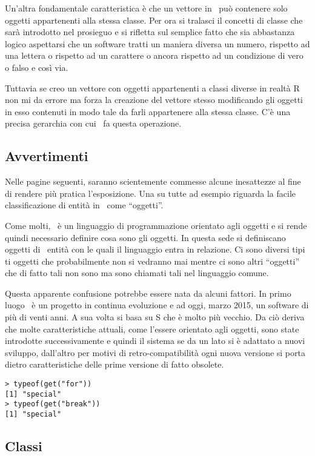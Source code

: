 Un'altra fondamentale caratteristica è che un vettore in \erre\ può contenere solo oggetti appartenenti alla stessa classe. Per ora si tralasci il concetti di classe che sarà introdotto nel prosieguo e si rifletta sul semplice fatto che sia abbastanza logico aspettarsi che un software tratti un maniera diversa un numero, rispetto ad una lettera o rispetto ad un carattere o ancora rispetto ad un condizione di vero o falso e così via.

Tuttavia se creo un vettore con oggetti appartenenti a classi diverse in realtà R non mi da errore ma forza la creazione del vettore stesso modificando gli oggetti in esso contenuti in modo tale da farli appartenere alla stessa classe. C’è una precisa gerarchia con cui \erre\ fa questa operazione.

\subsection{Avvertimenti}
Nelle pagine seguenti, saranno scientemente commesse alcune inesattezze al fine di rendere più pratica l'esposizione. Una su tutte ad esempio riguarda la facile classificazione di entità in \erre\ come ``oggetti''.

Come molti, \erre\ è un linguaggio di programmazione orientato agli oggetti e si rende quindi necessario definire cosa sono gli oggetti. In questa sede si definiscano oggetti di \erre\ entità con le quali il linguaggio entra in relazione. Ci sono diversi tipi ti oggetti che probabilmente non si vedranno mai mentre ci sono altri ``oggetti'' che di fatto tali non sono ma sono chiamati tali nel linguaggio comune.

Questa apparente confusione potrebbe essere nata da alcuni fattori. In primo luogo \erre\ è un progetto in continua evoluzione e ad oggi, marzo 2015, un software di più di venti anni. A sua volta si basa su S che è molto più vecchio. Da ciò deriva che molte caratteristiche attuali, come l'essere orientato agli oggetti, sono state introdotte successivamente e quindi il sistema se da un lato si è adattato a nuovi sviluppo, dall'altro per motivi di retro-compatibilità ogni nuova versione si porta dietro caratteristiche delle prime versione di fatto obsolete.
\begin{lstlisting}
> typeof(get("for"))
[1] "special"
> typeof(get("break"))
[1] "special"
\end{lstlisting}

\subsection{Classi}

